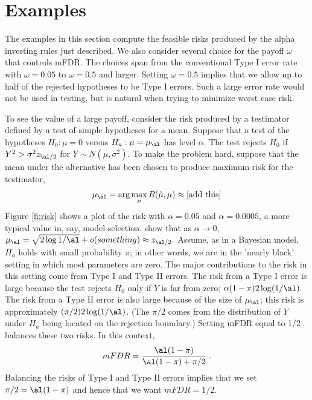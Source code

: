 \documentclass[12pt]{article}
\begin{document}
\section{ Examples }
 
 The examples in this section compute the feasible risks produced by the alpha
 investing rules just described.  We also consider several choice for the payoff
 $\omega$ that controls mFDR.  The choices span from the conventional Type I
 error rate with $\omega=0.05$ to $\omega = 0.5$ and larger.  Setting
 $\omega=0.5$ implies that we allow up to half of the rejected hypotheses to be
 Type I errors.  Such a large error rate would not be used in testing, but is
 natural when trying to minimize worst case risk.  

 \clearpage

 To see the value of a large payoff, consider the risk produced by a testimator
 defined by a test of simple hypotheses for a mean.  Suppose that a test of the
 hypotheses $H_0: \mu=0$ versus $H_a: \mu=\mu_\al$ has level $\alpha$.  The test
 rejects $H_0$ if $Y^2 > \sigma^2 z_{\al/2}$ for $Y \sim N(\mu,\sigma^2)$.  To
 make the problem hard, suppose that the mean under the alternative has been
 chosen to produce maximum risk for the testimator,
 \begin{equation}
    \mu_\al = \arg \max_\mu R(\hat\mu,\mu) \approx \mbox{[add this]}
 \label{eq:Malpha}
 \end{equation}
 Figure \ref{fi:risk} shows a plot of the risk with $\alpha=0.05$ and
 $\alpha=0.0005$, a more typical value in, say, model selection.
  \citet{fostergeorge94} show that as $\alpha \rightarrow 0$, $\mu_\al = \sqrt{2
 \log 1/\al} + o(something) \approx z_{\al/2}.$ Assume, as in a Bayesian model,
 $H_a$ holds with small probability $\pi$; in other words, we are in the 'nearly
 black' setting in which most parameters are zero.  The major contributions to
 the risk in this setting come from Type I and Type II errors.  The risk from a
 Type I error is large because the test rejects $H_0$ only if $Y$ is far from
 zero: $\alpha (1-\pi) 2 \log(1/\al).$ The risk from a Type II error is also
 large because of the size of $\mu_\al$; this risk is approximately $(\pi/2) 2
 \log(1/\al)$. (The $\pi/2$ comes from the distribution of $Y$ under $H_a$ being
 located on the rejection boundary.)  Setting mFDR equal to 1/2 balances these
two risks.  In this context,
 \begin{equation}
    mFDR = \frac{\al(1-\pi)}
                {\al(1-\pi) + \pi/2} \;.   
 \label{eq:mfdrexample}
 \end{equation}
 Balancing the risks of Type I and Type II errors implies that we set
$\pi/2=\al(1-\pi)$ and hence that we want $mFDR = 1/2$.
\end{document}
